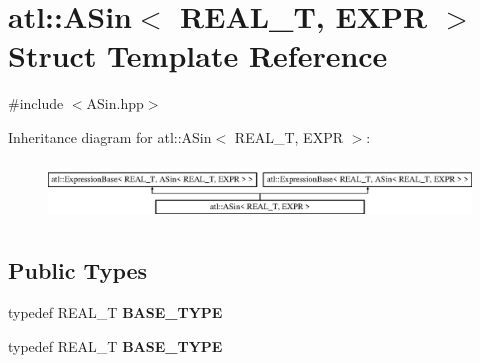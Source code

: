 \hypertarget{structatl_1_1_a_sin}{\section{atl\+:\+:A\+Sin$<$ R\+E\+A\+L\+\_\+\+T, E\+X\+P\+R $>$ Struct Template Reference}
\label{structatl_1_1_a_sin}
}


{\ttfamily \#include $<$A\+Sin.\+hpp$>$}

Inheritance diagram for atl\+:\+:A\+Sin$<$ R\+E\+A\+L\+\_\+\+T, E\+X\+P\+R $>$\+:\begin{figure}[H]
\begin{center}
\leavevmode
\includegraphics[height=1.613833cm]{structatl_1_1_a_sin}
\end{center}
\end{figure}
\subsection*{Public Types}
\begin{DoxyCompactItemize}
\item 
\hypertarget{structatl_1_1_a_sin_a85da08527224ed087dff8ac44e1ad203}{typedef R\+E\+A\+L\+\_\+\+T {\bfseries B\+A\+S\+E\+\_\+\+T\+Y\+P\+E}}\label{structatl_1_1_a_sin_a85da08527224ed087dff8ac44e1ad203}

\item 
\hypertarget{structatl_1_1_a_sin_a85da08527224ed087dff8ac44e1ad203}{typedef R\+E\+A\+L\+\_\+\+T {\bfseries B\+A\+S\+E\+\_\+\+T\+Y\+P\+E}}\label{structatl_1_1_a_sin_a85da08527224ed087dff8ac44e1ad203}

\end{DoxyCompactItemize}
